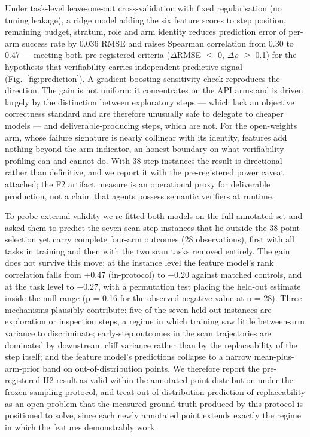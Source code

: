 Under task-level leave-one-out cross-validation with fixed regularisation (no tuning leakage), a ridge model adding the six feature scores to step position, remaining budget, stratum, role and arm identity reduces prediction error of per-arm success rate by 0.036 RMSE and raises Spearman correlation from 0.30 to 0.47 --- meeting both pre-registered criteria ($\Delta$RMSE $\leq$ 0, $\Delta$$\rho$ $\geq$ 0.1) for the hypothesis that verifiability carries independent predictive signal (Fig.~\ref{fig:prediction}). A gradient-boosting sensitivity check reproduces the direction. The gain is not uniform: it concentrates on the API arms and is driven largely by the distinction between exploratory steps --- which lack an objective correctness standard and are therefore unusually safe to delegate to cheaper models --- and deliverable-producing steps, which are not. For the open-weights arm, whose failure signature is nearly collinear with its identity, features add nothing beyond the arm indicator, an honest boundary on what verifiability profiling can and cannot do. With 38 step instances the result is directional rather than definitive, and we report it with the pre-registered power caveat attached; the F2 artifact measure is an operational proxy for deliverable production, not a claim that agents possess semantic verifiers at runtime.

To probe external validity we re-fitted both models on the full annotated set and asked them to predict the seven scan step instances that lie outside the 38-point selection yet carry complete four-arm outcomes (28 observations), first with all tasks in training and then with the two scan tasks removed entirely. The gain does not survive this move: at the instance level the feature model's rank correlation falls from +0.47 (in-protocol) to $-0.20$ against matched controls, and at the task level to $-0.27$, with a permutation test placing the held-out estimate inside the null range (p = 0.16 for the observed negative value at n = 28). Three mechanisms plausibly contribute: five of the seven held-out instances are exploration or inspection steps, a regime in which training saw little between-arm variance to discriminate; early-step outcomes in the scan trajectories are dominated by downstream cliff variance rather than by the replaceability of the step itself; and the feature model's predictions collapse to a narrow mean-plus-arm-prior band on out-of-distribution points. We therefore report the pre-registered H2 result as valid within the annotated point distribution under the frozen sampling protocol, and treat out-of-distribution prediction of replaceability as an open problem that the measured ground truth produced by this protocol is positioned to solve, since each newly annotated point extends exactly the regime in which the features demonstrably work.

